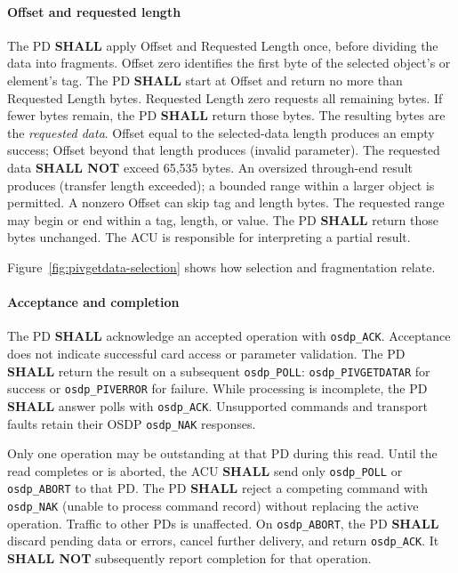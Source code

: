 \paragraph{Offset and requested length}
The PD \textbf{SHALL} apply Offset and Requested Length once, before dividing
the data into fragments. Offset zero identifies the first byte of the selected
object's or element's tag. The PD \textbf{SHALL} start at Offset and return
no more than Requested Length bytes. Requested Length zero requests all remaining bytes.
If fewer bytes remain, the PD \textbf{SHALL} return those bytes.
The resulting bytes are the \emph{requested data}.
Offset equal to the selected-data length produces an empty success;
Offset beyond that length produces  (invalid parameter).
The requested data \textbf{SHALL NOT} exceed 65,535 bytes.
An oversized through-end result produces  (transfer length exceeded);
a bounded range within a
larger object is permitted. A nonzero Offset can skip tag and length bytes.
The requested range may begin or end within a tag, length, or value.
The PD \textbf{SHALL} return those bytes unchanged. The ACU is responsible
for interpreting a partial result.

Figure~\ref{fig:pivgetdata-selection} shows how selection and fragmentation relate.


\paragraph{Acceptance and completion}
The PD \textbf{SHALL} acknowledge an accepted operation with \texttt{osdp\_ACK}.
Acceptance does not indicate successful card access or parameter validation.
The PD \textbf{SHALL} return the result on a subsequent \texttt{osdp\_POLL}:
\texttt{osdp\_PIVGETDATAR} for success or \texttt{osdp\_PIVERROR} for failure.
While processing is incomplete, the PD \textbf{SHALL} answer polls with
\texttt{osdp\_ACK}. Unsupported commands and transport faults retain their
OSDP \texttt{osdp\_NAK} responses.

Only one operation may be outstanding at that PD during this read.
Until the read completes or is aborted, the ACU \textbf{SHALL} send only
\texttt{osdp\_POLL} or \texttt{osdp\_ABORT} to that PD.
The PD \textbf{SHALL} reject a competing command with \texttt{osdp\_NAK}
 (unable to process command record) without replacing the active operation.
Traffic to other PDs is unaffected.
On \texttt{osdp\_ABORT}, the PD \textbf{SHALL} discard pending data or errors,
cancel further delivery, and return \texttt{osdp\_ACK}.
It \textbf{SHALL NOT} subsequently report completion for that operation.

